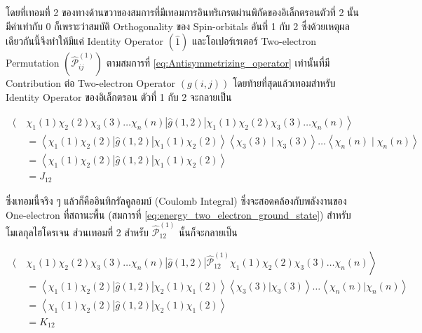 \noindent โดยที่เทอมที่ 2 ของทางด้านขวาของสมการที่มีเทอมการอินทริเกรตผ่านพิกัดของอิเล็กตรอนตัวที่ 2 นั้นมีค่าเท่ากับ 0 ก็เพราะว่าสมบัติ
Orthogonality ของ Spin-orbitals อันที่ 1 กับ 2 ซึ่งด้วยเหตุผลเดียวกันนี้จึงทำให้มีแค่ Identity Operator $(\hat{1})$ 
และโอเปอร์เรเตอร์ Two-electron Permutation $(\hat{\mathscr{P}}_{i j}^{(1)})$ ตามสมการที่ \ref{eq:Antisymmetrizing_operator} 
เท่านั้นที่มี Contribution ต่อ Two-electron Operator $(g(i, j))$ โดยท้ายที่สุดแล้วเทอมสำหรับ Identity Operator ของอิเล็กตรอน%
ตัวที่ 1 กับ 2 จะกลายเป็น

\begin{equation}
    \label{eq:J12_Coulomb_integral}
    \begin{aligned}
        \left\langle \right. & \chi_1(1) \chi_2(2) \chi_3(3) \dots \chi_n(n)|\hat{g}(1,2)| \chi_1(1) \chi_2(2) \chi_3(3) \dots \chi_n(n) \left. \right\rangle \\
        & = \left\langle\chi_1(1) \chi_2(2)|\hat{g}(1,2)| \chi_1(1) \chi_2(2)\right\rangle\left\langle\chi_3(3) \mid \chi_3(3)\right\rangle \dots\left\langle\chi_n(n) \mid \chi_n(n)\right\rangle \\
        & = \left\langle\chi_1(1) \chi_2(2)|\hat{g}(1,2)| \chi_1(1) \chi_2(2)\right\rangle \\ 
        & = J_{12}
    \end{aligned}
\end{equation}

\noindent ซึ่งเทอมนี้จริง ๆ แล้วก็คืออินทิกรัลคูลอมบ์ (Coulomb Integral) ซึ่งจะสอดคล้องกับพลังงานของ One-electron ที่สถานะพื้น 
(สมการที่ \ref{eq:energy_two_electron_ground_state}) สำหรับโมเลกุลไฮโดรเจน ส่วนเทอมที่ 2 สำหรับ 
$\hat{\mathcal{P}}_{12}^{(1)}$ นั้นก็จะกลายเป็น

\begin{equation}
    \label{eq:K12_exchange_integral}
    \begin{aligned}
        \left\langle \right. & \chi_1(1) \chi_2(2) \chi_3(3) \dots \chi_n(n)
            |\hat{g}(1,2)| 
            \hat{\mathscr{P}}_{12}^{(1)} \chi_1(1) \chi_2(2) \chi_3(3) \dots \chi_n(n) \left. \right\rangle \\
        & = \left\langle\chi_1(1) \chi_2(2)
            |\hat{g}(1,2)| 
            \chi_2(1) \chi_1(2)\right\rangle
            \left\langle\chi_3(3)|\chi_3(3)\right\rangle \dots\left\langle\chi_n(n)|\chi_n(n)\right\rangle \\
        & = \left\langle\chi_1(1) \chi_2(2)
            |\hat{g}(1,2)| 
            \chi_2(1) \chi_1(2)\right\rangle \\ 
        & = K_{12}
    \end{aligned}
\end{equation}

